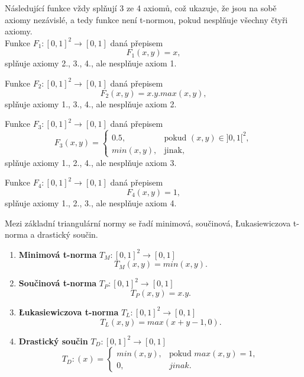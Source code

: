 \begin{example} N\'asleduj\'ic\'i funkce vždy spl\v nují 3 ze 4  axiom\r u, což ukazuje, že jsou na sobě axiomy nez\' avislé, a tedy funkce není t-normou, pokud nespl\v nuje všechny čtyři axiomy.\\ 
    Funkce $F_1 : [0, 1]^2 \to [0, 1]$ daná přepisem
    $$F_1(x,y) = x,$$
    spl\v nuje axiomy 2., 3., 4., ale nespl\v nuje axiom 1.
    
    Funkce $F_2 : [0, 1]^2 \to [0, 1]$ daná přepisem
    $$F_2(x,y) = x.y.max(x,y),$$
    spl\v nuje axiomy 1., 3., 4., ale nespl\v nuje axiom 2.

    Funkce $F_3 : [0, 1]^2 \to [0, 1]$ daná přepisem
    $$ F_3(x,y)=\begin{cases} 0.5, & \mbox{pokud }(x, y) \in ]0,1[^2, \\
         min(x,y), & \mbox{jinak,}\end{cases} $$
    spl\v nuje axiomy 1., 2., 4., ale nespl\v nuje axiom 3.
    
    Funkce $F_4 : [0, 1]^2 \to [0, 1]$ daná přepisem
    $$F_4(x,y) = 1,$$
    spl\v nuje axiomy 1., 2., 3., ale nespl\v nuje axiom 4.

  \end{example}

Mezi základní triangulární normy se řadí minimová, součinová, Łukasiewiczova t-norma a drastický součin.
\begin{example}
\cite{KMP}
    \begin{enumerate}
    \item \textbf{Minimová t-norma} $T_M: [0,1]^2 \rightarrow [0,1]$
    $$T_M(x,y) = min(x,y).$$
    \item \textbf{Součinová t-norma} $T_P: [0,1]^2 \rightarrow [0,1]$
    $$T_P(x,y) = x.y.$$
    \item \textbf{Łukasiewiczova t-norma} $T_L: [0,1]^2 \rightarrow [0,1]$
    $$T_L(x,y) = max(x+y-1,0).$$
    \item \textbf{Drastický součin} $T_D: [0,1]^2 \rightarrow [0,1]$
    $$T_D:(x)=\begin{cases} min(x,y), & \mbox{pokud }  max(x,y) = 1,\\ 
    0, &  jinak.  \end{cases}$$\\
\end{enumerate}
\end{example}


